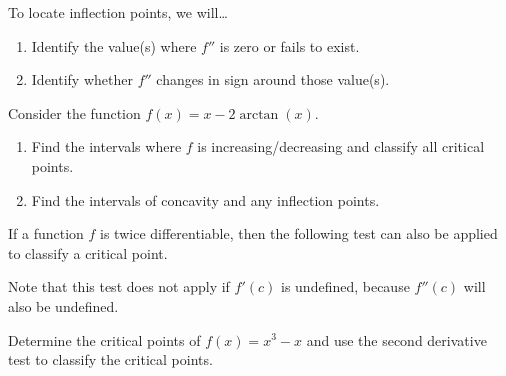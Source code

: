 \documentclass[12pt]{article}
\begin{document}
\newpage

To locate inflection points, we will\dots
\begin{enumerate}
	\item[\tc{1}] Identify the value(s) where $f''$ is zero or fails to exist.
	\item[\tc{2}] Identify whether $f''$ changes in sign around those value(s).
\end{enumerate}

\vspace{5mm}

\Example Consider the function $f(x)=x-2\arctan(x)$.
\begin{enumerate}
\item[\tc{1}] Find the intervals where $f$ is increasing/decreasing and classify all critical points.
\vspace{75mm}
\item[\tc{2}] Find the intervals of concavity and any inflection points.
\end{enumerate}

\newpage

If a function $f$ is twice differentiable, then the following test can also be applied to classify a critical point.

\vspace{5mm}


\vspace{5mm}

Note that this test does not apply if $f'(c)$ is undefined, because $f''(c)$ will also be undefined.

\Example Determine the critical points of $f(x)=x^3-x$ and use the second derivative test to classify the critical points.

\vfill
\end{document}
